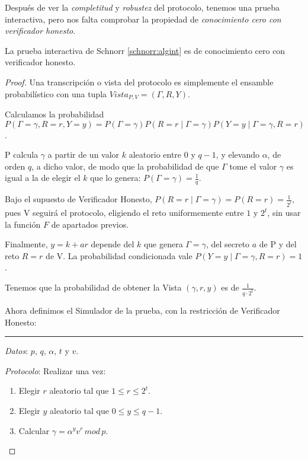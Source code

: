 \hfil



Después de ver la \textit{completitud} y \textit{robustez} del protocolo, tenemos una prueba interactiva, pero nos falta comprobar la propiedad de \textit{conocimiento cero con verificador honesto}.

\begin{theorem}
	La prueba interactiva de Schnorr \ref{schnorr:algint} es de conocimiento cero con verificador honesto.
\end{theorem}

\begin{proof}


Una transcripción o vista del protocolo es simplemente el ensamble probabilístico con una tupla $Vista_{P,V} =(\Gamma, R, Y)$.

Calculamos la probabilidad $P(\Gamma=\gamma, R=r, Y=y) = P(\Gamma=\gamma)P(R=r\mid \Gamma =\gamma)P(Y=y\mid \Gamma=\gamma, R=r)$.


P calcula $\gamma$ a partir de un valor $k$ aleatorio entre $0$ y $q-1$, y elevando $\alpha$, de orden $q$, a dicho valor, de modo que la probabilidad de que $\Gamma$ tome el valor $\gamma$ es igual a la de elegir el $k$ que lo genera: $P(\Gamma=\gamma)=\frac{1}{q}$.

Bajo el supuesto de Verificador Honesto, $P(R=r\mid \Gamma =\gamma)=P(R=r)=\frac{1}{2^t}$, pues V seguirá el protocolo, eligiendo el reto uniformemente entre $1$ y $2^t$, sin usar la función $F$ de apartados previos.

Finalmente, $y=k+ar$ depende del $k$ que genera $\Gamma=\gamma$, del secreto $a$ de P y del reto $R=r$ de V. La probabilidad condicionada vale $P(Y=y \mid \Gamma =\gamma, R=r)=1$.

Tenemos que la probabilidad de obtener la Vista $(\gamma, r, y)$ es de $\frac{1}{q\cdot 2^{t}}$.

\hfil

Ahora definimos el Simulador de la prueba, con la restricción de Verificador Honesto:


\rule{\textwidth}{1pt}
\begin{algorithm}
	
	\hfil
	
	\textit{Datos}: $p$, $q$, $\alpha$, $t$ y $v$.
	
	\textit{Protocolo}: Realizar una vez:
	
	\begin{enumerate}
		
		\item Elegir $r$ aleatorio tal que $1\leq r \leq 2^t$.
		\item Elegir $y$ aleatorio tal que $0\leq y \leq q-1$.
		\item Calcular $\gamma = \alpha ^y v^r \, mod \, p$.		
		

\end{enumerate}
\end{algorithm}
\end{proof}
